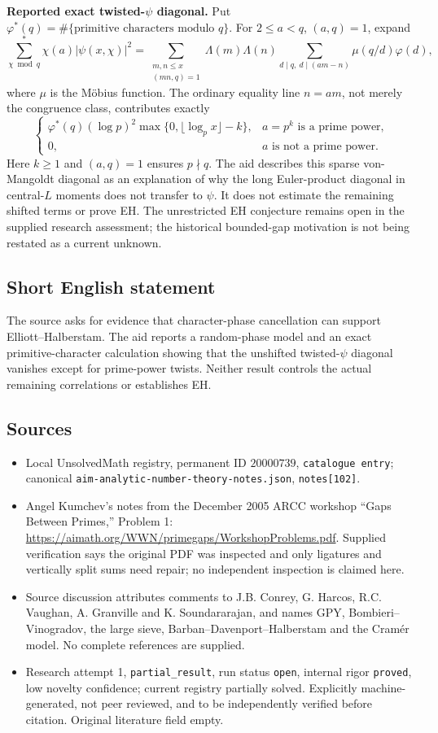 \documentclass[11pt]{article}
\begin{document}
\textbf{Reported exact twisted-$\psi$ diagonal.} Put $\varphi^*(q)=\#\{\text{primitive characters modulo }q\}$. For $2\leq a<q$, $(a,q)=1$, expand
\[
 \sum_{\chi\bmod q}^{*}\chi(a)|\psi(x,\chi)|^2
 =\sum_{\substack{m,n\leq x\\(mn,q)=1}}\Lambda(m)\Lambda(n)
 \sum_{d\mid q,\ d\mid(am-n)}\mu(q/d)\varphi(d),
\]
where $\mu$ is the M\"obius function. The ordinary equality line $n=am$, not merely the congruence class, contributes exactly
\[
 \begin{cases}
 \varphi^*(q)(\log p)^2\max\{0,\lfloor\log_p x\rfloor-k\},&a=p^k\text{ is a prime power},\\
 0,&a\text{ is not a prime power}.
 \end{cases}
\]
Here $k\geq1$ and $(a,q)=1$ ensures $p\nmid q$. The aid describes this sparse von-Mangoldt diagonal as an explanation of why the long Euler-product diagonal in central-$L$ moments does not transfer to $\psi$. It does not estimate the remaining shifted terms or prove EH. The unrestricted EH conjecture remains open in the supplied research assessment; the historical bounded-gap motivation is not being restated as a current unknown.
\subsection{Short English statement}
The source asks for evidence that character-phase cancellation can support Elliott--Halberstam. The aid reports a random-phase model and an exact primitive-character calculation showing that the unshifted twisted-$\psi$ diagonal vanishes except for prime-power twists. Neither result controls the actual remaining correlations or establishes EH.
\subsection{Sources}
\begin{itemize}
\item Local UnsolvedMath registry, permanent ID $20000739$, \texttt{catalogue entry}; canonical \texttt{aim-analytic-number-theory-notes.json}, \texttt{notes[102]}.
\item Angel Kumchev's notes from the December 2005 ARCC workshop ``Gaps Between Primes,'' Problem 1: \url{https://aimath.org/WWN/primegaps/WorkshopProblems.pdf}. Supplied verification says the original PDF was inspected and only ligatures and vertically split sums need repair; no independent inspection is claimed here.
\item Source discussion attributes comments to J.B. Conrey, G. Harcos, R.C. Vaughan, A. Granville and K. Soundararajan, and names GPY, Bombieri--Vinogradov, the large sieve, Barban--Davenport--Halberstam and the Cram\'er model. No complete references are supplied.
\item Research attempt 1, \texttt{partial\_result}, run status \texttt{open}, internal rigor \texttt{proved}, low novelty confidence; current registry partially solved. Explicitly machine-generated, not peer reviewed, and to be independently verified before citation. Original literature field empty.
\end{itemize}
\end{document}
